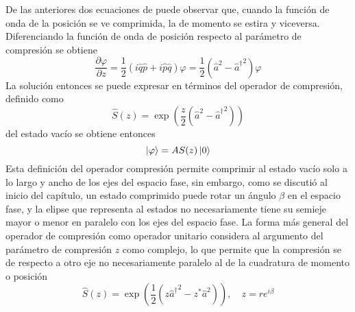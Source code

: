 De las anteriores dos ecuaciones de puede observar que, cuando la función de onda de la posición se ve comprimida, la de momento se estira y viceversa. Diferenciando la función de onda de posición respecto al parámetro de compresión se obtiene \cite{Leonhardt}
\begin{equation*}
  \frac{\partial \varphi}{\partial z} = \frac{1}{2}\left( i\hat{q}\hat{p} + i\hat{p}\hat{q} \right)\varphi = \frac{1}{2}\left( {\hat{a}}^2 - {\hat{a}^{\dagger}}^2 \right)\varphi
\end{equation*}
La solución entonces se puede expresar en términos del operador de compresión, definido como
\begin{equation*}
  \hat{S}(z) = \exp{\left( \frac{z}{2}(\hat{a}^2 - {\hat{a}^{\dagger}}^2) \right)}
\end{equation*}
del estado vacío se obtiene entonces
\begin{equation*}
  \ket{\varphi} = A{S}(z)\ket{0}
\end{equation*}
Esta definición del operador compresión permite comprimir al estado vacío solo a lo largo y ancho de los ejes del espacio fase, sin embargo, como se discutió al inicio del capítulo, un estado comprimido puede rotar un ángulo $\beta$ en el espacio fase, y la elipse que representa al estados no necesariamente tiene su semieje mayor o menor en paralelo con los ejes del espacio fase. La forma más general del operador de compresión como operador unitario considera al argumento del parámetro de compresión $z$ como complejo, lo que permite que la compresión se de respecto a otro eje no necesariamente paralelo al de la cuadratura de momento o posición \cite{Loudon}
\begin{equation*}
  \hat{S}(z) = \exp{\left( \frac{1}{2} (z{\hat{a}^{\dagger}}^2 - z^* {\hat{a}}^2) \right)}, \quad z = re^{i\beta}
\end{equation*}

